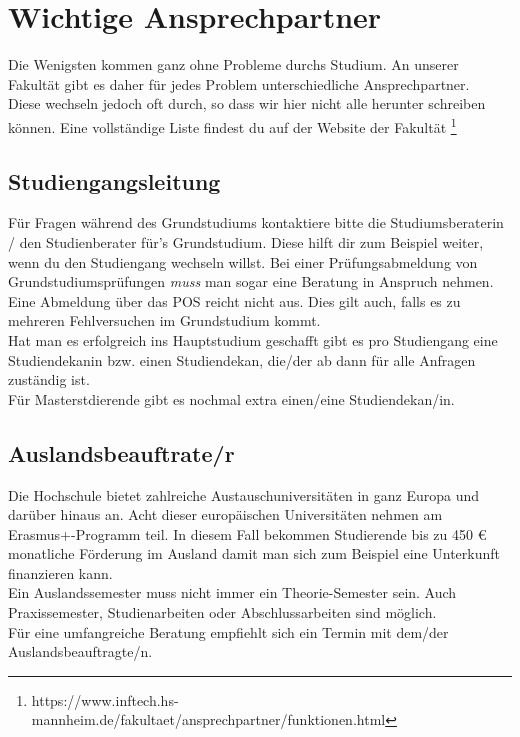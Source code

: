 \section*{Wichtige Ansprechpartner}
Die Wenigsten kommen ganz ohne Probleme durchs Studium.
An unserer Fakultät gibt es daher für jedes Problem unterschiedliche Ansprechpartner.
\\
Diese wechseln jedoch oft durch, so dass wir hier nicht alle herunter schreiben können.
Eine vollständige Liste findest du auf der Website der Fakultät \footnote{https://www.inftech.hs-mannheim.de/fakultaet/ansprechpartner/funktionen.html}

\subsection*{Studiengangsleitung}
Für Fragen während des Grundstudiums kontaktiere bitte die Studiumsberaterin / den Studienberater für's Grundstudium.
Diese hilft dir zum Beispiel weiter, wenn du den Studiengang wechseln willst. 
Bei einer Prüfungsabmeldung von Grundstudiumsprüfungen \textit{muss} man sogar eine Beratung in Anspruch nehmen.
Eine Abmeldung über das POS reicht nicht aus.
Dies gilt auch, falls es zu mehreren Fehlversuchen im Grundstudium kommt.
\\
Hat man es erfolgreich ins Hauptstudium geschafft gibt es pro Studiengang eine Studiendekanin bzw. einen Studiendekan, die/der ab dann für alle Anfragen zuständig ist.
\\
Für Masterstdierende gibt es nochmal extra einen/eine Studiendekan/in.

\subsection*{Auslandsbeauftrate/r}
Die Hochschule bietet zahlreiche Austauschuniversitäten in ganz Europa und darüber hinaus an.
Acht dieser europäischen Universitäten nehmen am Erasmus+-Programm teil.
In diesem Fall bekommen Studierende bis zu 450 € monatliche Förderung im Ausland damit man sich zum Beispiel eine Unterkunft finanzieren kann. 
\\
Ein Auslandssemester muss nicht immer ein Theorie-Semester sein.
Auch Praxissemester, Studienarbeiten oder Abschlussarbeiten sind möglich.
\\
Für eine umfangreiche Beratung empfiehlt sich ein Termin mit dem/der Auslandsbeauftragte/n.
